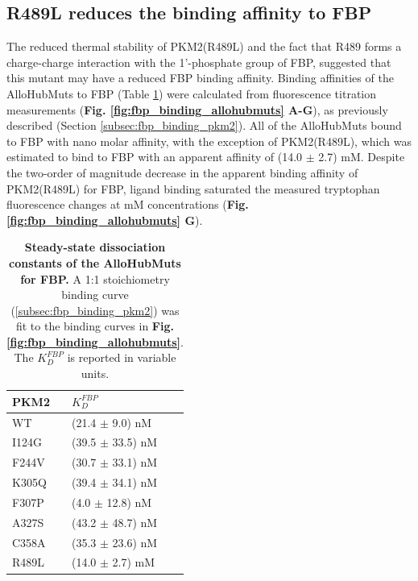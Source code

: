 \subsection{R489L reduces the binding affinity to FBP}
The reduced thermal stability of PKM2(R489L) and the fact that R489 forms a charge-charge interaction with the 1'-phosphate group of FBP, suggested that this mutant may have a reduced FBP binding affinity. Binding affinities of the AlloHubMuts to FBP (Table \ref{tab:fbp_binding_allohubmuts}) were calculated from fluorescence titration measurements (\textbf{Fig. \ref{fig:fbp_binding_allohubmuts} A-G}), as previously described (Section \ref{subsec:fbp_binding_pkm2}). All of the AlloHubMuts bound to FBP with nano molar affinity, with the exception of PKM2(R489L), which was estimated to bind to FBP with an apparent affinity of (14.0 $\pm$ 2.7) mM. Despite the two-order of magnitude decrease in the apparent binding affinity of PKM2(R489L) for FBP, ligand binding saturated the measured tryptophan fluorescence changes at mM concentrations (\textbf{Fig. \ref{fig:fbp_binding_allohubmuts} G}). 
%
%
%
%
\begin{table}[ht]
\centering
\caption[Steady-state dissociation constants of the AlloHubMuts for FBP.] {\textbf{Steady-state dissociation constants of the AlloHubMuts for FBP.} A 1:1 stoichiometry binding curve (\ref{subsec:fbp_binding_pkm2}) was fit to the binding curves in \textbf{Fig. \ref{fig:fbp_binding_allohubmuts}}. The $K_{D}^{FBP}$ is reported in variable units.}
\label{tab:fbp_binding_allohubmuts}
\begin{tabular}{@{}ll@{}}
\toprule
PKM2  & $K_{D}^{FBP}$       \\ \midrule
WT    & (21.4 $\pm$ 9.0) nM  \\
I124G & (39.5 $\pm$ 33.5) nM \\
F244V & (30.7 $\pm$ 33.1) nM \\
K305Q & (39.4 $\pm$ 34.1) nM \\
F307P & (4.0 $\pm$ 12.8) nM  \\
A327S & (43.2 $\pm$ 48.7) nM \\
C358A & (35.3 $\pm$ 23.6) nM \\
R489L & (14.0 $\pm$ 2.7) mM  \\ \bottomrule
\end{tabular}
\end{table}
%
%
%
%
%
